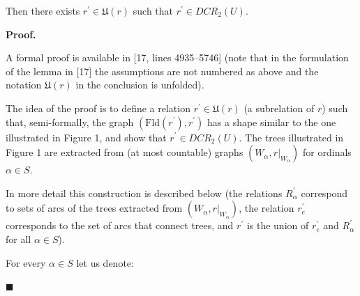  
Then there exists $r^{\prime}\in\mathfrak{U}(r)$ such that $r^{\prime}\in DCR_{2}(U)$.\par
 
 
 
 
\par\medskip\noindent\textbf{Proof.}\par
 
 
A formal proof is available in [17, lines 4935–5746] (note that in the formulation of the lemma in [17] the assumptions are not numbered as above and the notation $\mathfrak{U}(r)$ in the conclusion is unfolded).\par
 
 
 
The idea of the proof is to define a relation $r^{\prime}\in\mathfrak{U}(r)$ (a subrelation of $r$) such that, semi-formally, the graph $(\mathrm{Fld}(r^{\prime}),r^{\prime})$ has a shape similar to the one illustrated in Figure 1, and show that $r^{\prime}\in DCR_{2}(U)$. The trees illustrated in Figure 1 are extracted from (at most countable) graphs $(W_{\alpha},r|_{W_{\alpha}})$ for ordinals $\alpha\in S$.\par
 
 
 
In more detail this construction is described below (the relations $R^{\prime}_{\alpha}$ correspond to sets of arcs of the trees extracted from $(W_{\alpha},r|_{W_{\alpha}})$, the relation $r_{e}^{\prime}$ corresponds to the set of arcs that connect trees, and $r^{\prime}$ is the union of $r^{\prime}_{e}$ and $R^{\prime}_{\alpha}$ for all $\alpha\in S$).\par
 
 
 
For every $\alpha\in S$ let us denote:\par
  
\par\noindent  $\blacksquare$ 
 
